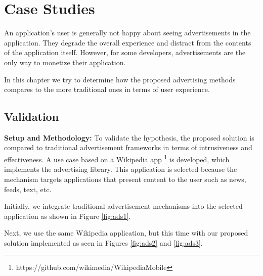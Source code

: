 \chapter{Case Studies}

An application's user is generally not happy about seeing advertisements in the application. They degrade the overall experience and distract from the contents of the application itself. However, for some developers, advertisements are the only way to monetize their application.

In this chapter we try to determine how the proposed advertising methods compares to the more traditional ones in terms of user experience.

\section{Validation}

\textbf{Setup and Methodology:} To validate the hypothesis, the proposed solution is compared to traditional advertisement frameworks in terms of intrusiveness and effectiveness. A use case based on a Wikipedia app \footnote{https://github.com/wikimedia/WikipediaMobile} is developed, which implements the advertising library. This application is selected because the mechanism targets applications that present content to the user such as news, feeds, text, etc.

Initially, we integrate  traditional advertisement mechanisms into the selected application as shown in Figure \ref{fig:ads1}.

Next, we use the same Wikipedia application, but this time with our proposed solution implemented as seen in Figures \ref{fig:ads2} and \ref{fig:ads3}.


